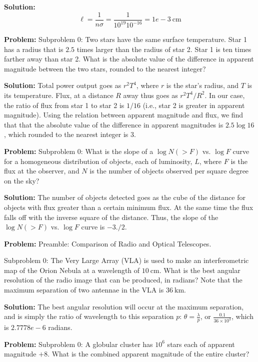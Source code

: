 \documentclass[10pt]{article}
\begin{document}
\textbf{Solution:}
\[
\ell=\frac{1}{n \sigma}=\frac{1}{10^{19} 10^{-16}}=\boxed{1e-3} \mathrm{~cm}
\]


\textbf{Problem:}
Subproblem 0: Two stars have the same surface temperature. Star 1 has a radius that is $2.5$ times larger than the radius of star 2. Star 1 is ten times farther away than star 2. What is the absolute value of the difference in apparent magnitude between the two stars, rounded to the nearest integer?


\textbf{Solution:}
Total power output goes as $r^2 T^4$, where $r$ is the star's radius, and $T$ is its temperature.  Flux, at a distance $R$ away thus goes as $r^2 T^4 / R^2$.  In our case, the ratio of flux from star 1 to star 2 is $1/16$ (i.e., star 2 is greater in apparent magnitude).  Using the relation between apparent magnitude and flux, we find that that the absolute value of the difference in apparent magnitudes is $2.5 \log{16}$, which rounded to the nearest integer is $\boxed{3}$.


\textbf{Problem:}
Subproblem 0: What is the slope of a $\log N(>F)$ vs. $\log F$ curve for a homogeneous distribution of objects, each of luminosity, $L$, where $F$ is the flux at the observer, and $N$ is the number of objects observed per square degree on the sky?


\textbf{Solution:}
The number of objects detected goes as the cube of the distance for objects with flux greater than a certain minimum flux. At the same time the flux falls off with the inverse square of the distance. Thus, the slope of the $\log N(>F)$ vs. $\log F$ curve is $\boxed{-3./2}$.


\textbf{Problem:}
Preamble: Comparison of Radio and Optical Telescopes.

Subproblem 0: The Very Large Array (VLA) is used to make an interferometric map of the Orion Nebula at a wavelength of $10 \mathrm{~cm}$. What is the best angular resolution of the radio image that can be produced, in radians? Note that the maximum separation of two antennae in the VLA is $36 \mathrm{~km}$.


\textbf{Solution:}
The best angular resolution will occur at the maximum separation, and is simply the ratio of wavelength to this separation $p$: $\theta = \frac{\lambda}{p}$, or $\frac{0.1}{36\times 10^3}$, which is $\boxed{2.7778e-6}$ radians.


\textbf{Problem:}
Subproblem 0: A globular cluster has $10^{6}$ stars each of apparent magnitude $+8$. What is the combined apparent magnitude of the entire cluster?
\end{document}
